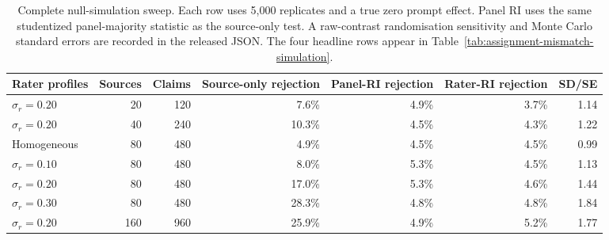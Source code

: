 \begin{table}[t]
\centering\small
\setlength{\tabcolsep}{4pt}
\begin{tabular}{lrrrrrr}
\toprule
Rater profiles & Sources & Claims & Source-only rejection & Panel-RI rejection & Rater-RI rejection & SD/SE \\
\midrule
$\sigma_r=0.20$ & 20 & 120 & 7.6\% & 4.9\% & 3.7\% & 1.14 \\
$\sigma_r=0.20$ & 40 & 240 & 10.3\% & 4.5\% & 4.3\% & 1.22 \\
Homogeneous & 80 & 480 & 4.9\% & 4.5\% & 4.5\% & 0.99 \\
$\sigma_r=0.10$ & 80 & 480 & 8.0\% & 5.3\% & 4.5\% & 1.13 \\
$\sigma_r=0.20$ & 80 & 480 & 17.0\% & 5.3\% & 4.6\% & 1.44 \\
$\sigma_r=0.30$ & 80 & 480 & 28.3\% & 4.8\% & 4.8\% & 1.84 \\
$\sigma_r=0.20$ & 160 & 960 & 25.9\% & 4.9\% & 5.2\% & 1.77 \\
\bottomrule
\end{tabular}
\caption{Complete null-simulation sweep. Each row uses 5,000 replicates and a true zero prompt effect. Panel RI uses the same studentized panel-majority statistic as the source-only test. A raw-contrast randomisation sensitivity and Monte Carlo standard errors are recorded in the released JSON. The four headline rows appear in Table~\ref{tab:assignment-mismatch-simulation}.}
\label{tab:assignment-mismatch-simulation-full}
\end{table}
